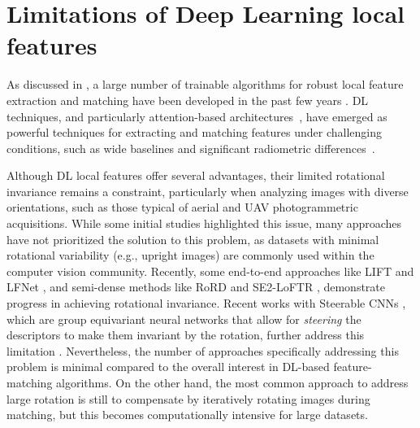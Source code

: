 
\section{Limitations of Deep Learning local features}\label{sec:5:limitation_dl_feats}

As discussed in , a large number of trainable algorithms for robust local feature extraction and matching have been developed in the past few years \citep{remondino2022_at_with_dl}.
DL techniques, and particularly attention-based architectures~\citep{vaswani2023attention}, have emerged as powerful techniques for extracting and matching features under challenging conditions, such as wide baselines and significant radiometric differences~\citep{jin_image_2021, Yao_2021}.

Although DL local features offer several advantages, their limited rotational invariance remains a constraint, particularly when analyzing images with diverse orientations, such as those typical of aerial and UAV photogrammetric acquisitions. 
While some initial studies highlighted this issue, many approaches have not prioritized the solution to this problem, as datasets with minimal rotational variability (e.g., upright images) are commonly used within the computer vision community. 
Recently, some end-to-end approaches like LIFT \citep{yi2016lift} and LFNet \citep{ono2018lfnet}, and semi-dense methods like RoRD \citep{parihar2022rord} and SE2-LoFTR \citep{Bkman2022_se2loftr}, demonstrate progress in achieving rotational invariance. 
Recent works with Steerable CNNs \citep{cohen2016steerable}, which are group equivariant neural networks that allow for \textit{steering} the descriptors to make them invariant by the rotation, further address this limitation \cite{Bkman2022_se2loftr, bokman2023steerers}.
Nevertheless, the number of approaches specifically addressing this problem is minimal compared to the overall interest in DL-based feature-matching algorithms.
On the other hand, the most common approach to address large rotation is still to compensate by iteratively rotating images during matching, but this becomes computationally intensive for large datasets.

